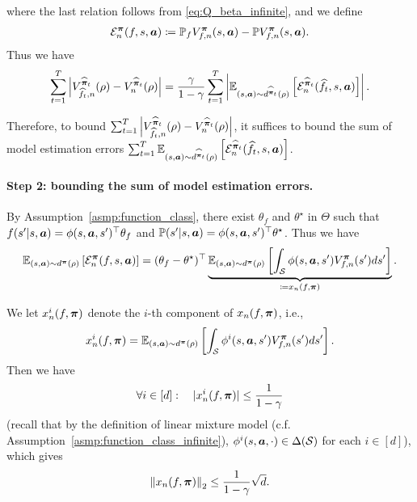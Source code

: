 where the last relation follows from \eqref{eq:Q_beta_infinite}, and we define
\begin{align}\label{eq:gE_infinite}
    {\mathcal{E}}_n^{\bm{\pi}}(f,s,{\bm{a}})\coloneqq {\mathbb P}_f V_{f,n}^{\bm{\pi}}(s,{\bm{a}})-{\mathbb P} V_{f,n}^{\bm{\pi}}(s,{\bm{a}}).
\end{align}
Thus we have
\begin{align}\label{eq:V_diff_decompose_infinite}
    \sum_{t=1}^T \left|V_{\widehat{f}_t,n}^{\widehat{{\bm{\pi}}}_t}(\rho)-V_{n}^{\widehat{{\bm{\pi}}}_t}(\rho)\right| = \frac{\gamma}{1-\gamma}\sum_{t=1}^T \left|\mathbb{E}_{(s,{\bm{a}})\sim d^{\widehat{{\bm{\pi}}}_t}(\rho)}\left[{\mathcal{E}}_n^{\widehat{{\bm{\pi}}}_t}(\widehat{f}_t,s,{\bm{a}})\right]\right|.
\end{align}

Therefore, to bound $\sum_{t=1}^T \left|V_{\widehat{f}_t,n}^{\widehat{{\bm{\pi}}}_t}(\rho)-V_{n}^{\widehat{{\bm{\pi}}}_t}(\rho)\right|$, it suffices to bound the sum of model estimation errors $\sum_{t=1}^T\mathbb{E}_{(s,{\bm{a}})\sim d^{\widehat{{\bm{\pi}}}_t}(\rho)}\left[{\mathcal{E}}_n^{\widehat{{\bm{\pi}}}_t}(\widehat{f}_t,s,{\bm{a}})\right]$.

\paragraph{Step 2: bounding the sum of model estimation errors.} 
By Assumption~\ref{asmp:function_class}, there exist $\theta_f$ and $\theta^\star$ in $\Theta$ such that $f(s'|s,{\bm{a}})=\phi(s,{\bm{a}},s')^\top\theta_f$ and ${\mathbb P}(s'|s,{\bm{a}})=\phi(s,{\bm{a}},s')^\top\theta^\star$.
Thus we have
\begin{align}
    \mathbb{E}_{(s,{\bm{a}})\sim d^{\bm{\pi}}(\rho)}\left[{\mathcal{E}}_n^{\bm{\pi}}(f,s,{\bm{a}})\right] = (\theta_f-\theta^\star)^\top\underbrace{\mathbb{E}_{(s,{\bm{a}})\sim d^{\bm{\pi}}(\rho)}\left[\int_{{\mathcal{S}}}\phi(s,{\bm{a}},s')V_{f,n}^{\bm{\pi}}(s')ds'\right]}_{\coloneqq x_n(f,{\bm{\pi}})}.
\end{align}

We let $x_n^i(f,{\bm{\pi}})$ denote the $i$-th component of $x_n(f,{\bm{\pi}})$, i.e., $$x_n^i(f,{\bm{\pi}})=\mathbb{E}_{(s,{\bm{a}})\sim d^{\bm{\pi}}(\rho)}\left[\int_{{\mathcal{S}}}\phi^i(s,{\bm{a}},s')V_{f,n}^{\bm{\pi}}(s')ds'\right].$$
Then we have
\begin{align}\label{eq:x_n_i_bound_infinite}
    \forall i\in[d]:\quad |x_n^i(f,{\bm{\pi}})|\leq \frac{1}{1-\gamma}
\end{align}
(recall that by the definition of linear mixture model (c.f. Assumption~\ref{asmp:function_class_infinite}), $\phi^i(s,{\bm{a}},\cdot)\in\Delta({\mathcal{S}})$ for each $i\in[d]$), which gives
\begin{align}\label{eq:x_n_bound_infinite}
    \left\| x_n(f,{\bm{\pi}}) \right\|_2\leq \frac{1}{1-\gamma}\sqrt{d}.
\end{align}


